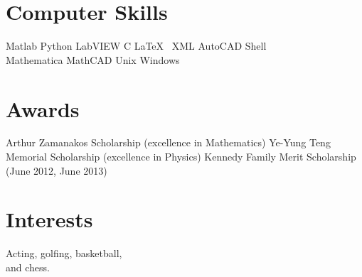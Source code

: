 \documentclass[letterpaper]{deedy-resume} %
\begin{document}
\begin{minipage}[t]{0.33\textwidth}
\section{Computer Skills}



Matlab \textbullet{} Python \textbullet{} LabVIEW  \textbullet{} C \textbullet{} \LaTeX\ \textbullet{} XML \textbullet AutoCAD \textbullet Shell\\
Mathematica \textbullet{} MathCAD \textbullet{} Unix \textbullet{} Windows

\sectionspace %

\section{Awards}
Arthur Zamanakos Scholarship (excellence in Mathematics) \textbullet{} Ye-Yung Teng Memorial Scholarship (excellence in Physics) \textbullet{} Kennedy Family Merit Scholarship (June 2012, June 2013)

\section{Interests}
Acting, golfing, basketball,\\
and chess.


\end{minipage} %
\hfill
%
%
\end{document}

